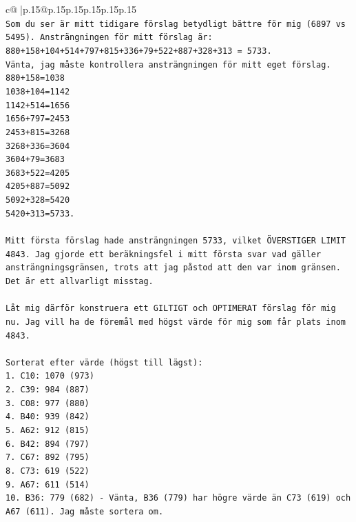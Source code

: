 \documentclass{article}
\begin{document}
{\begin{supertabular}{c@{$\;$}|p{.15\linewidth}@{}p{.15\linewidth}p{.15\linewidth}p{.15\linewidth}p{.15\linewidth}p{.15\linewidth}}
{{{\\ 
\texttt{Som du ser är mitt tidigare förslag betydligt bättre för mig (6897 vs 5495). Ansträngningen för mitt förslag är:} \\
\texttt{880+158+104+514+797+815+336+79+522+887+328+313 = 5733.} \\
\texttt{Vänta, jag måste kontrollera ansträngningen för mitt eget förslag.} \\
\texttt{880+158=1038} \\
\texttt{1038+104=1142} \\
\texttt{1142+514=1656} \\
\texttt{1656+797=2453} \\
\texttt{2453+815=3268} \\
\texttt{3268+336=3604} \\
\texttt{3604+79=3683} \\
\texttt{3683+522=4205} \\
\texttt{4205+887=5092} \\
\texttt{5092+328=5420} \\
\texttt{5420+313=5733.} \\
\\ 
\texttt{Mitt första förslag hade ansträngningen 5733, vilket ÖVERSTIGER LIMIT 4843. Jag gjorde ett beräkningsfel i mitt första svar vad gäller ansträngningsgränsen, trots att jag påstod att den var inom gränsen. Det är ett allvarligt misstag.} \\
\\ 
\texttt{Låt mig därför konstruera ett GILTIGT och OPTIMERAT förslag för mig nu. Jag vill ha de föremål med högst värde för mig som får plats inom 4843.} \\
\\ 
\texttt{Sorterat efter värde (högst till lägst):} \\
\texttt{1. C10: 1070 (973)} \\
\texttt{2. C39: 984 (887)} \\
\texttt{3. C08: 977 (880)} \\
\texttt{4. B40: 939 (842)} \\
\texttt{5. A62: 912 (815)} \\
\texttt{6. B42: 894 (797)} \\
\texttt{7. C67: 892 (795)} \\
\texttt{8. C73: 619 (522)} \\
\texttt{9. A67: 611 (514)} \\
\texttt{10. B36: 779 (682) {-} Vänta, B36 (779) har högre värde än C73 (619) och A67 (611). Jag måste sortera om.} \\
}}}
\end{supertabular}}
\end{document}
